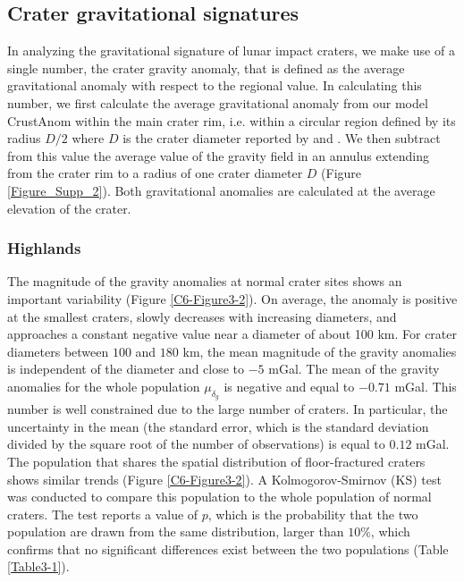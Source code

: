 \subsection{Crater gravitational signatures}
\label{C6-sec:crat-grav-sign}
  
In analyzing the  gravitational signature of lunar  impact craters, we
make  use of  a single  number, the  crater gravity  anomaly, that  is
defined  as the  average  gravitational anomaly  with  respect to  the
regional value.   In calculating this  number, we first  calculate the
average gravitational anomaly from our model CrustAnom within the main
crater rim, i.e.  within a circular region defined by its radius $D/2$
where $D$ is  the crater diameter reported  by \citet{Head:2010fy} and
\citet{Jozwiak:2012dq}.  We then subtract  from this value the average
value of the gravity field in an annulus extending from the crater rim
to a radius  of one crater diameter  $D$ (Figure \ref{Figure_Supp_2}).
Both gravitational  anomalies are calculated at  the average elevation
of the crater.

\subsubsection{Highlands}
\label{C6-sec:highlands-1}
  
The magnitude of the gravity anomalies at normal crater sites shows an
important  variability (Figure  \ref{C6-Figure3-2}).  On  average, the
anomaly is  positive at  the smallest  craters, slowly  decreases with
increasing diameters, and approaches a  constant negative value near a
diameter  of about  100 km.   For crater  diameters between  $100$ and
$180$ km, the  mean magnitude of the gravity  anomalies is independent
of  the diameter  and close  to $-5$  mGal.  The  mean of  the gravity
anomalies for  the whole  population $\mu_{\delta_g}$ is  negative and
equal to  $-0.71$ mGal.  This  number is  well constrained due  to the
large number of  craters.  In particular, the uncertainty  in the mean
(the standard  error, which is  the standard deviation divided  by the
square root of  the number of observations) is equal  to $ 0.12$ mGal.
The population that shares the spatial distribution of floor-fractured
craters   shows  similar   trends   (Figure  \ref{C6-Figure3-2}).    A
Kolmogorov-Smirnov (KS) test was  conducted to compare this population
to the whole  population of normal craters.  The test  reports a value
of $p$,  which is the  probability that  the two population  are drawn
from the same distribution, larger than $10\%$, which confirms that no
significant  differences  exist  between the  two  populations  (Table
\ref{Table3-1}).
  
